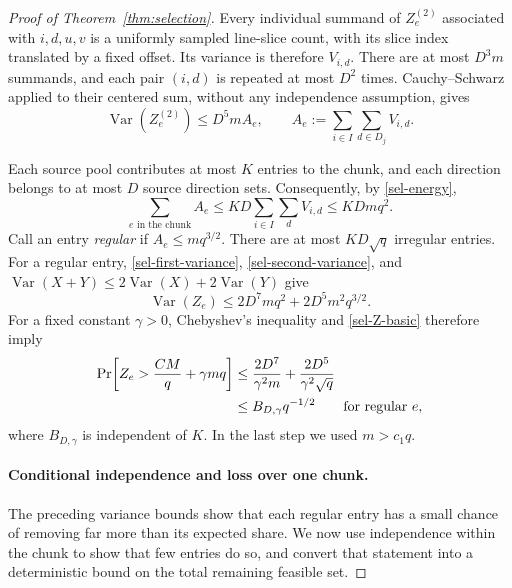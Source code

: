 \begin{proof}[Proof of Theorem~\ref{thm:selection}]
Every individual summand of $Z_e^{(2)}$ associated with $i,d,u,v$ is a
uniformly sampled line-slice count, with its slice index translated by
a fixed offset.  Its variance is therefore $V_{i,d}$.  There are at
most $D^3m$ summands, and each pair $(i,d)$ is repeated at most $D^2$
times.  Cauchy--Schwarz applied to their centered sum, without any
independence assumption, gives
\begin{equation}\label{sel-second-variance}
 \operatorname{Var}(Z_e^{(2)})
 \le D^5m A_e,
 \qquad
 A_e:=\sum_{i\in I}\sum_{d\in D_j}V_{i,d}.
\end{equation}

Each source pool contributes at most $K$ entries to the chunk, and
each direction belongs to at most $D$ source direction sets.
Consequently, by \eqref{sel-energy},
\begin{equation}\label{sel-exception-energy}
 \sum_{e\text{ in the chunk}} A_e
 \le KD\sum_{i\in I}\sum_d V_{i,d}
 \le KDmq^2.
\end{equation}
Call an entry \emph{regular} if $A_e\le mq^{3/2}$.  There are at most
$KD\sqrt q$ irregular entries.  For a regular entry,
\eqref{sel-first-variance}, \eqref{sel-second-variance}, and
$\operatorname{Var}(X+Y)\le2\operatorname{Var}(X)+2\operatorname{Var}(Y)$
give
\begin{equation}\label{sel-regular-variance}
 \operatorname{Var}(Z_e)
 \le 2D^7mq^2+2D^5m^2q^{3/2}.
\end{equation}
For a fixed constant $\gamma>0$, Chebyshev's inequality and
\eqref{sel-Z-basic} therefore imply
\begin{align}
 \Pr\!\left[Z_e>\frac{CM}{q}+\gamma mq\right]
 &\le \frac{2D^7}{\gamma^2m}
       +\frac{2D^5}{\gamma^2\sqrt q}
 \notag\\
 &\le B_{D,\gamma}q^{-1/2}
 \qquad\text{for regular }e,
 \label{sel-regular-tail}
\end{align}
where $B_{D,\gamma}$ is independent of $K$.  In the last step we used
$m>c_1q$.

\paragraph{Conditional independence and loss over one chunk.}
The preceding variance bounds show that each regular entry has a
small chance of removing far more than its expected share. We now
use independence within the chunk to show that few entries do so,
and convert that statement into a deterministic bound on the total
remaining feasible set.


\end{proof}
